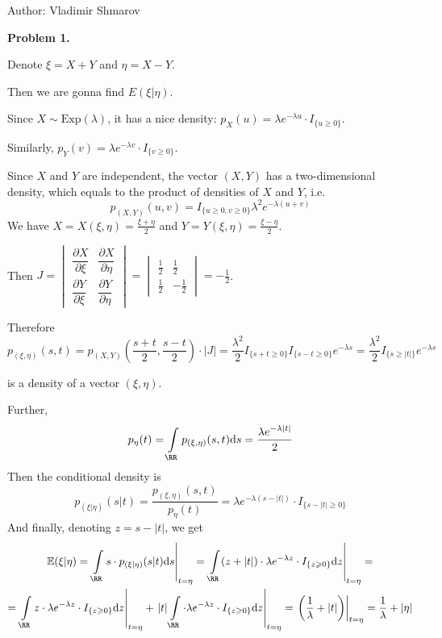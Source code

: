 \documentclass[12pt, a4paper]{article}
\newcommand{\ds}{\displaystyle}
\newcommand{\dz}{\mathrm{d}z}
\begin{document}
Author: Vladimir Shmarov


\textbf{Problem 1.}\par
Denote $\xi = X + Y$ and $\eta = X - Y$.\par
Then we are gonna find  $E(\xi| \eta)$.\par
Since $X \sim \mathrm{Exp}(\lambda)$, it has a nice density: $p_{X}(u) = \lambda e^{-\lambda u}\cdot I_{\{u \geqslant 0\}}$.\par
Similarly, $p_{Y}(v) =  \lambda e^{-\lambda v}\cdot I_{\{v \geqslant 0\}}$.\par
Since $X$ and $Y$ are independent, the vector $(X,Y)$ has a two-dimensional density, which equals to the product of densities of $X$ and $Y$, i.e.
\[
p_{(X,Y)}(u,v) = I_{\{u\geqslant 0, v\geqslant 0\}}\lambda^{2}e^{-\lambda(u+v)}
\]
We have $X = X(\xi, \eta) = \frac{\ds \xi + \eta}{\ds 2}$ and $Y = Y(\xi, \eta) = \frac{\ds \xi - \eta}{\ds 2}$.\par
Then $J = \begin{vmatrix}\dfrac{\ds \partial X}{\ds \partial \xi} & \dfrac{\ds \partial X}{\ds \partial \eta}\\ \dfrac{\ds \partial Y}{\ds \partial \xi}& \dfrac{\ds \partial Y}{\ds \partial \eta}
\end{vmatrix} = \begin{vmatrix}\frac{\ds 1}{\ds 2} & \frac{\ds 1}{\ds 2}\\ \frac{\ds 1}{\ds 2}& -\frac{\ds 1}{\ds 2}
\end{vmatrix} = - \frac{\ds 1}{\ds 2}$.\par
Therefore
\[
p_{(\xi, \eta)}(s,t) = p_{(X,Y)}\left(\frac{\ds s+t}{\ds 2}, \frac{\ds s-t}{\ds 2}\right)\cdot |J| = \frac{\ds \lambda^{2}}{\ds 2}I_{\{ s + t \geqslant 0\}}I_{\{s - t \geqslant 0\}}e^{-\lambda s} = \frac{\ds \lambda^{2}}{\ds 2}I_{\{ s \geqslant |t|\}}e^{-\lambda s}
\]
\par
is a density of a vector $(\xi, \eta)$.\par
Further,
\[
p_{\eta}(t) = \int\limits_{\RR}p_{(\xi, \eta)}(s,t)\mathrm{d}s = \frac{\ds \lambda e^{-\lambda|t|}}{\ds 2}
\]
Then the conditional density is
\[
p_{(\xi | \eta)}(s|t) = \frac{\ds p_{(\xi, \eta)}(s,t)}{\ds p_{\eta}(t)} = \lambda e^{-\lambda(s-|t|)}\cdot I_{\{s - |t|\geqslant 0\}}
\]
And finally, denoting $z = s - |t|$, we get
\begin{multline}
\E(\xi|\eta) = \left.\int\limits_{\RR}s\cdot p_{(\xi|\eta)}(s|t)\mathrm{d}s\right|_{t = \eta} = \left.\int\limits_{\RR}(z + |t|)\cdot\lambda e^{-\lambda z}\cdot I_{\{z\geqslant 0\}}\dz\right|_{t = \eta}  = \\
= \left.\int\limits_{\RR}z\cdot\lambda e^{-\lambda z}\cdot I_{\{z\geqslant 0\}}\dz\right|_{t = \eta} + \left.|t|\int\limits_{\RR}\cdot\lambda e^{-\lambda z}\cdot I_{\{z\geqslant 0\}}\dz\right|_{t = \eta} =  \left.\left(\frac{\ds 1}{\ds \lambda} + |t|\right)\right|_{t = \eta} = \frac{\ds 1}{\ds \lambda} + |\eta|
\end{multline}
\end{document}
